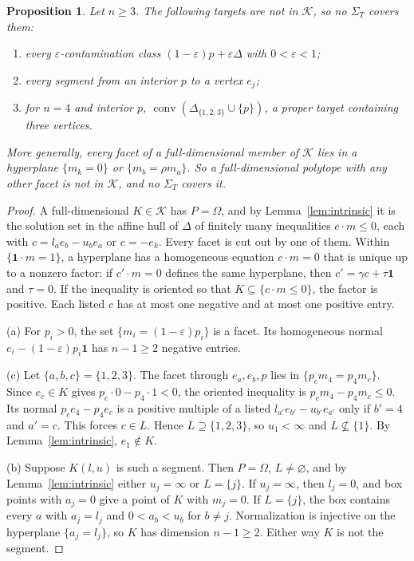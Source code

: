 \documentclass[11pt]{article}
\newtheorem{proposition}[theorem]{Proposition}
\theoremstyle{remark}\newtheorem{remark}[theorem]{Remark}
\newcommand{\K}{\mathcal K}
\newcommand{\conv}{\operatorname{conv}}
\newcommand{\one}{\mathbf 1}
\begin{document}
\begin{proposition}\label{prop:notcovered}
Let $n\ge3$. The following targets are not in $\K$, so no $\Sigma_T$
covers them:
\begin{enumerate}[label=(\alph*),leftmargin=*]
\item every $\varepsilon$-contamination class $(1-\varepsilon)p+\varepsilon\Delta$
with $0<\varepsilon<1$;
\item every segment from an interior $p$ to a vertex $e_j$;
\item for $n=4$ and interior $p$, $\conv(\Delta_{\{1,2,3\}}\cup\{p\})$,
a proper target containing three vertices.
\end{enumerate}
More generally, every facet of a full-dimensional member of $\K$ lies in a
hyperplane $\{m_k=0\}$ or $\{m_b=\rho m_a\}$. So a full-dimensional
polytope with any other facet is not in $\K$, and no $\Sigma_T$ covers it.
\end{proposition}
\begin{proof}
A full-dimensional $K\in\K$ has $P=\Omega$, and by
Lemma~\ref{lem:intrinsic} it is the solution set in the affine hull of
$\Delta$ of finitely many inequalities $c\cdot m\le0$, each with
$c=l_ae_b-u_be_a$ or $c=-e_k$. Every facet is cut out by one of them.
Within $\{\one\cdot m=1\}$, a hyperplane has a homogeneous equation $c\cdot
m=0$ that is unique up to a nonzero factor: if $c'\cdot m=0$ defines the
same hyperplane, then $c'=\gamma c+\tau\one$ and $\tau=0$. If the
inequality is oriented so that $K\subseteq\{c\cdot m\le0\}$, the factor is
positive. Each listed $c$ has at most one negative and at most one
positive entry.

(a) For $p_i>0$, the set $\{m_i=(1-\varepsilon)p_i\}$ is a facet. Its
homogeneous normal $e_i-(1-\varepsilon)p_i\one$ has $n-1\ge2$ negative
entries.

(c) Let $\{a,b,c\}=\{1,2,3\}$. The facet through $e_a,e_b,p$ lies in
$\{p_cm_4=p_4m_c\}$. Since $e_c\in K$ gives $p_c\cdot0-p_4\cdot1<0$, the
oriented inequality is $p_cm_4-p_4m_c\le0$. Its normal $p_ce_4-p_4e_c$ is a
positive multiple of a listed $l_{a'}e_{b'}-u_{b'}e_{a'}$ only if $b'=4$ and
$a'=c$. This forces $c\in L$. Hence $L\supseteq\{1,2,3\}$,
so $u_1<\infty$ and $L\not\subseteq\{1\}$. By Lemma~\ref{lem:intrinsic},
$e_1\notin K$.

(b) Suppose $K(l,u)$ is such a segment. Then $P=\Omega$, $L\ne\varnothing$,
and by Lemma~\ref{lem:intrinsic} either $u_j=\infty$ or $L=\{j\}$. If
$u_j=\infty$, then $l_j=0$, and box points with $a_j=0$ give a point of $K$
with $m_j=0$. If $L=\{j\}$, the box contains every $a$ with $a_j=l_j$ and
$0<a_b<u_b$ for $b\ne j$. Normalization is injective on the hyperplane
$\{a_j=l_j\}$, so $K$ has dimension $n-1\ge2$. Either way $K$ is not
the segment.
\end{proof}
\end{document}
